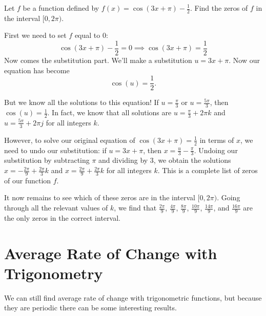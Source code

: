 \documentclass{ximera}
\begin{document}
\begin{example}
Let $f$ be a function defined by $f(x)=\cos(3x + \pi) - \frac{1}{2}$. Find the zeros of $f$ in the interval $[0, 2\pi)$.

\begin{explanation}
First we need to set $f$ equal to $0$:
$$\cos(3x + \pi) - \frac{1}{2} = 0 \implies \cos(3x + \pi) = \frac{1}{2}$$
Now comes the substitution part. We'll make a substitution $u = 3x + \pi$. Now our equation has become
$$\cos(u) = \frac{1}{2}.$$

But we know all the solutions to this equation! If $u = \frac{\pi}{3}$ or $u = \frac{5\pi}{3}$, then $\cos(u) = \frac{1}{2}$. In fact, we know that all solutions are $u = \frac{\pi}{3} + 2\pi k$ and $u = \frac{5\pi}{3} + 2\pi j$ for all integers $k$.

However, to solve our original equation of $\cos(3x + \pi) = \frac{1}{2}$ in terms of $x$, we need to undo our substitution: if $u = 3x + \pi$, then $x = \frac{u}{3} - \frac{\pi}{3}$. Undoing our substitution by subtracting $\pi$ and dividing by $3$, we obtain the solutions $x = -\frac{2\pi}{9} + \frac{2\pi}{3} k$ and $x = \frac{2\pi}{9} + \frac{2\pi}{3} k$ for all integers $k$. This is a complete list of zeros of our function $f$.   

It now remains to see which of these zeros are in the interval $[0, 2\pi)$. Going through all the relevant values of $k$, we find that $\frac{2\pi}{9}$, $\frac{4\pi}{9}$, $\frac{8\pi}{9}$, $\frac{10\pi}{9}$, $\frac{14\pi}{9}$, and $\frac{16\pi}{9}$ are the only zeros in the correct interval.  
\end{explanation}
\end{example}

\section{Average Rate of Change with Trigonometry}

We can still find average rate of change with trigonometric functions, but because they are periodic there can be some interesting results.
\end{document}
